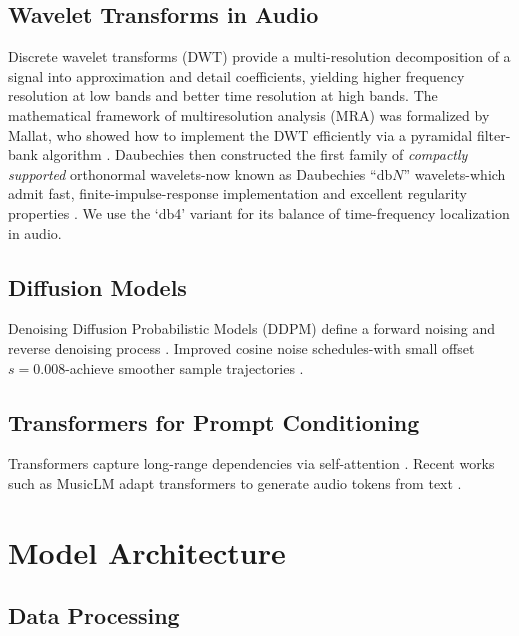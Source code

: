 \documentclass[12pt]{report}
\begin{document}
\section{Wavelet Transforms in Audio}
Discrete wavelet transforms (DWT) provide a multi-resolution decomposition of a signal into approximation and detail coefficients, yielding higher frequency resolution at low bands and better time resolution at high bands.  The mathematical framework of multiresolution analysis (MRA) was formalized by Mallat, who showed how to implement the DWT efficiently via a pyramidal filter-bank algorithm \cite{Mallat1989}.  Daubechies then constructed the first family of \emph{compactly supported} orthonormal wavelets-now known as Daubechies “db$N$” wavelets-which admit fast, finite-impulse-response implementation and excellent regularity properties \cite{Daubechies1988}.  We use the ‘db4’ variant for its balance of time-frequency localization in audio.
\section{Diffusion Models}
Denoising Diffusion Probabilistic Models (DDPM) define a forward noising and reverse denoising process \cite{Ho2020}. Improved cosine noise schedules-with small offset $s=0.008$-achieve smoother sample trajectories \cite{NicholDhariwal2021}.

\section{Transformers for Prompt Conditioning}
Transformers capture long-range dependencies via self-attention \cite{Vaswani2017}. Recent works such as MusicLM adapt transformers to generate audio tokens from text \cite{Agostinelli2023}.

\chapter{Model Architecture}

\section{Data Processing}
\end{document}
